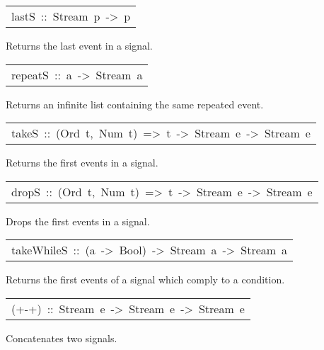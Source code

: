 \begin{haddockdesc}
\item[\begin{tabular}{@{}l}
lastS\ ::\ Stream\ p\ ->\ p
\end{tabular}]\haddockbegindoc
Returns the last event in a signal.\par

\end{haddockdesc}
\begin{haddockdesc}
\item[\begin{tabular}{@{}l}
repeatS\ ::\ a\ ->\ Stream\ a
\end{tabular}]\haddockbegindoc
Returns an infinite list containing the same repeated event.\par

\end{haddockdesc}
\begin{haddockdesc}
\item[\begin{tabular}{@{}l}
takeS\ ::\ (Ord\ t,\ Num\ t)\ =>\ t\ ->\ Stream\ e\ ->\ Stream\ e
\end{tabular}]\haddockbegindoc
Returns the first  events in a signal.\par

\end{haddockdesc}
\begin{haddockdesc}
\item[\begin{tabular}{@{}l}
dropS\ ::\ (Ord\ t,\ Num\ t)\ =>\ t\ ->\ Stream\ e\ ->\ Stream\ e
\end{tabular}]\haddockbegindoc
Drops the first  events in a signal.\par

\end{haddockdesc}
\begin{haddockdesc}
\item[\begin{tabular}{@{}l}
takeWhileS\ ::\ (a\ ->\ Bool)\ ->\ Stream\ a\ ->\ Stream\ a
\end{tabular}]\haddockbegindoc
Returns the first events of a signal which comply to a condition.\par

\end{haddockdesc}
\begin{haddockdesc}
\item[\begin{tabular}{@{}l}
(+-+)\ ::\ Stream\ e\ ->\ Stream\ e\ ->\ Stream\ e
\end{tabular}]\haddockbegindoc
Concatenates two signals.\par

\end{haddockdesc}